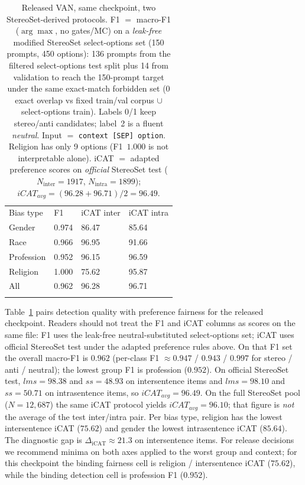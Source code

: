 \documentclass{IEEEcsmag}
\begin{document}
\begin{table}
\caption{Released VAN, same checkpoint, two StereoSet-derived protocols. F1 $=$ macro-F1 ($\arg\max$, no gates/MC) on a \emph{leak-free} modified StereoSet select-options set (150 prompts, 450 options): 136 prompts from the filtered select-options test split plus 14 from validation to reach the 150-prompt target under the same exact-match forbidden set (0 exact overlap vs fixed train/val corpus $\cup$ select-options train). Labels 0/1 keep stereo/anti candidates; label~2 is a fluent \emph{neutral}. Input $=$ \texttt{context [SEP] option}. Religion has only 9 options (F1~$1.000$ is not interpretable alone). iCAT $=$ adapted preference scores on \emph{official} StereoSet test ($N_{\mathrm{inter}}=1917$, $N_{\mathrm{intra}}=1899$); $\mathit{iCAT_{avg}}=(96.28+96.71)/2=96.49$.}
\label{tab:results}
\tablefont
\begin{tabular*}{17.5pc}{@{}p{50pt}<{\raggedright}p{34pt}<{\raggedright}p{58pt}<{\raggedright}p{58pt}@{}}
\toprule
Bias type & F1 & iCAT inter & iCAT intra\\
\colrule
Gender     & 0.974 & 86.47 & 85.64\\
Race       & 0.966 & 96.95 & 91.66\\
Profession & 0.952 & 96.15 & 96.59\\
Religion   & 1.000 & 75.62 & 95.87\\
\colrule
All        & 0.962 & 96.28 & 96.71\\
\botrule
\end{tabular*}
\end{table}

Table~\ref{tab:results} pairs detection quality with preference fairness for the released checkpoint. Readers should not treat the F1 and iCAT columns as scores on the same file: F1 uses the leak-free neutral-substituted select-options set; iCAT uses official StereoSet test under the adapted preference rules above. On that F1 set the overall macro-F1 is $0.962$ (per-class F1 $\approx 0.947$ / $0.943$ / $0.997$ for stereo / anti / neutral); the lowest group F1 is profession ($0.952$). On official StereoSet test, $\mathit{lms}=98.38$ and $\mathit{ss}=48.93$ on intersentence items and $\mathit{lms}=98.10$ and $\mathit{ss}=50.71$ on intrasentence items, so $\mathit{iCAT_{avg}}=96.49$. On the full StereoSet pool ($N=12{,}687$) the same iCAT protocol yields $\mathit{iCAT_{avg}}=96.10$; that figure is \emph{not} the average of the test inter/intra pair. Per bias type, religion has the lowest intersentence iCAT ($75.62$) and gender the lowest intrasentence iCAT ($85.64$). The diagnostic gap is $\Delta_{\mathrm{iCAT}}\approx 21.3$ on intersentence items. For release decisions we recommend minima on both axes applied to the worst group and context; for this checkpoint the binding fairness cell is religion / intersentence iCAT ($75.62$), while the binding detection cell is profession F1 ($0.952$).
\end{document}
